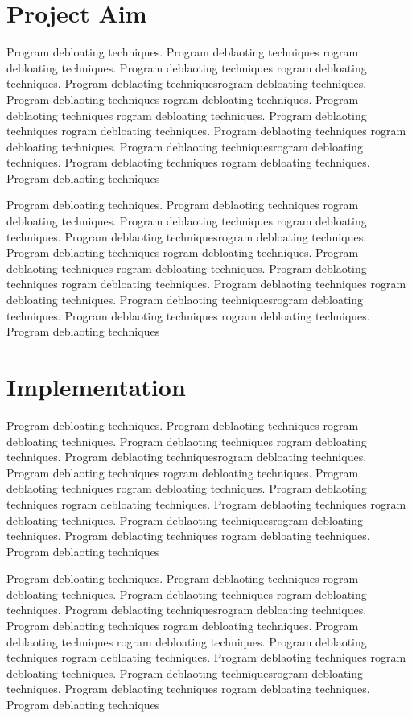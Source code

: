 \documentclass{relatorio}
\begin{document}
\section{Project Aim}%
\label{Tools}

Program debloating techniques. Program deblaoting techniques rogram debloating techniques. Program deblaoting techniques
rogram debloating techniques. Program deblaoting techniquesrogram debloating techniques. Program deblaoting techniques
rogram debloating techniques. Program deblaoting techniques rogram debloating techniques. Program deblaoting techniques
rogram debloating techniques. Program deblaoting techniques 
rogram debloating techniques. Program deblaoting techniquesrogram debloating techniques. Program deblaoting techniques
rogram debloating techniques. Program deblaoting techniques

Program debloating techniques. Program deblaoting techniques rogram debloating techniques. Program deblaoting techniques
rogram debloating techniques. Program deblaoting techniquesrogram debloating techniques. Program deblaoting techniques
rogram debloating techniques. Program deblaoting techniques rogram debloating techniques. Program deblaoting techniques
rogram debloating techniques. Program deblaoting techniques 
rogram debloating techniques. Program deblaoting techniquesrogram debloating techniques. Program deblaoting techniques
rogram debloating techniques. Program deblaoting techniques

\section{Implementation}%
\label{Tools}

Program debloating techniques. Program deblaoting techniques rogram debloating techniques. Program deblaoting techniques
rogram debloating techniques. Program deblaoting techniquesrogram debloating techniques. Program deblaoting techniques
rogram debloating techniques. Program deblaoting techniques rogram debloating techniques. Program deblaoting techniques
rogram debloating techniques. Program deblaoting techniques 
rogram debloating techniques. Program deblaoting techniquesrogram debloating techniques. Program deblaoting techniques
rogram debloating techniques. Program deblaoting techniques

Program debloating techniques. Program deblaoting techniques rogram debloating techniques. Program deblaoting techniques
rogram debloating techniques. Program deblaoting techniquesrogram debloating techniques. Program deblaoting techniques
rogram debloating techniques. Program deblaoting techniques rogram debloating techniques. Program deblaoting techniques
rogram debloating techniques. Program deblaoting techniques 
rogram debloating techniques. Program deblaoting techniquesrogram debloating techniques. Program deblaoting techniques
rogram debloating techniques. Program deblaoting techniques
\end{document}
